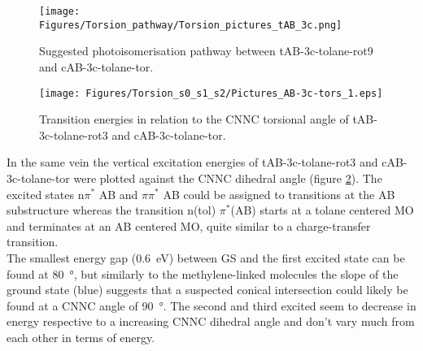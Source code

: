 %
%
%
\begin{figure}[H]
    \centering
    \texttt{[image: Figures/Torsion\_pathway/Torsion\_pictures\_tAB\_3c.png]}
    \caption{Suggested photoisomerisation pathway between tAB-3c-tolane-rot9 and cAB-3c-tolane-tor.}
    \label{fig:tors_tAB-cAB-3c-pathway}
\end{figure}
%
%
\begin{figure}[H]
    \centering
    \texttt{[image: Figures/Torsion\_s0\_s1\_s2/Pictures\_AB-3c-tors\_1.eps]}
    \caption{Transition energies in relation to the CNNC torsional angle of tAB-3c-tolane-rot3 and cAB-3c-tolane-tor.}
    \label{fig:tors-tAB-cAB-3c}
\end{figure}
%
In the same vein the vertical excitation energies of tAB-3c-tolane-rot3 and cAB-3c-tolane-tor were plotted against the CNNC dihedral angle (figure \ref{fig:tors-tAB-cAB-3c}). The excited states n$\pi^{*}$ AB and $\pi\pi^{*}$ AB could be assigned to transitions at the AB substructure whereas the transition n(tol) $\pi^{*}$(AB) starts at a tolane centered MO and terminates at an AB centered MO, quite similar to a charge-transfer transition. \\
The smallest energy gap (\SI{0.6}{\eV}) between GS and the first excited state can be found at \SI{80}{\degree}, but similarly to the methylene-linked molecules the slope of the ground state (blue) suggests that a suspected conical intersection could likely be found at a CNNC angle of \SI{90}{\degree}. The second and third excited seem to decrease in energy respective to a increasing CNNC dihedral angle and don't vary much from each other in terms of energy.


